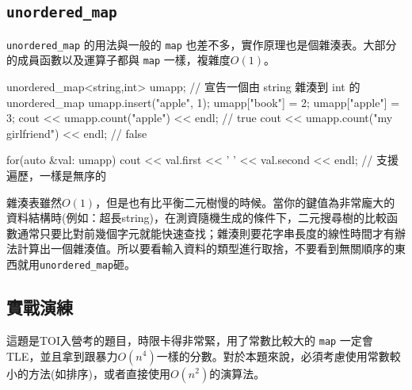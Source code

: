 \documentclass[main.tex]{subfiles}
\begin{document}
\subsection{\texttt{unordered\_map}}
\texttt{unordered\_map} 的用法與一般的 \texttt{map} 也差不多，實作原理也是個雜湊表。大部分的成員函數以及運算子都與 \texttt{map} 一樣，複雜度$O(1)$。
\begin{C++}
unordered_map<string,int> umapp;
// 宣告一個由 string 雜湊到 int 的 unordered_map
umapp.insert({"apple", 1});
umapp["book"] = 2;
umapp["apple"] = 3;
cout << umapp.count("apple") << endl; // true
cout << umapp.count("my girlfriend") << endl; // false

for(auto &val: umapp)
    cout << val.first << ' ' << val.second << endl;
// 支援遍歷，一樣是無序的
\end{C++}
\indent\indent 雜湊表雖然$O(1)$，但是也有比平衡二元樹慢的時候。當你的鍵值為非常龐大的資料結構時(例如：超長string)，在測資隨機生成的條件下，二元搜尋樹的比較函數通常只要比對前幾個字元就能快速查找；雜湊則要花字串長度的線性時間才有辦法計算出一個雜湊值。所以要看輸入資料的類型進行取捨，不要看到無關順序的東西就用\texttt{unordered\_map}砸。
\subsection{實戰演練}
這題是TOI入營考的題目，時限卡得非常緊，用了常數比較大的 \texttt{map} 一定會TLE，並且拿到跟暴力$O(n^4)$一樣的分數。對於本題來說，必須考慮使用常數較小的方法(如排序)，或者直接使用$O(n^2)$的演算法。
\end{document}
